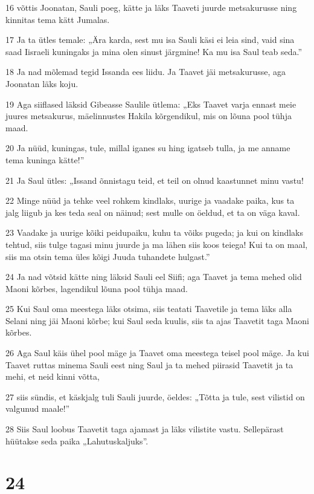 \par 16 võttis Joonatan, Sauli poeg, kätte ja läks Taaveti juurde metsakurusse ning kinnitas tema kätt Jumalas.
\par 17 Ja ta ütles temale: „Ära karda, sest mu isa Sauli käsi ei leia sind, vaid sina saad Iisraeli kuningaks ja mina olen sinust järgmine! Ka mu isa Saul teab seda.”
\par 18 Ja nad mõlemad tegid Issanda ees liidu. Ja Taavet jäi metsakurusse, aga Joonatan läks koju.
\par 19 Aga siiflased läksid Gibeasse Saulile ütlema: „Eks Taavet varja ennast meie juures metsakurus, mäelinnustes Hakila kõrgendikul, mis on lõuna pool tühja maad.
\par 20 Ja nüüd, kuningas, tule, millal iganes su hing igatseb tulla, ja me anname tema kuninga kätte!”
\par 21 Ja Saul ütles: „Issand õnnistagu teid, et teil on olnud kaastunnet minu vastu!
\par 22 Minge nüüd ja tehke veel rohkem kindlaks, uurige ja vaadake paika, kus ta jalg liigub ja kes teda seal on näinud; sest mulle on öeldud, et ta on väga kaval.
\par 23 Vaadake ja uurige kõiki peidupaiku, kuhu ta võiks pugeda; ja kui on kindlaks tehtud, siis tulge tagasi minu juurde ja ma lähen siis koos teiega! Kui ta on maal, siis ma otsin tema üles kõigi Juuda tuhandete hulgast.”
\par 24 Ja nad võtsid kätte ning läksid Sauli eel Siifi; aga Taavet ja tema mehed olid Maoni kõrbes, lagendikul lõuna pool tühja maad.
\par 25 Kui Saul oma meestega läks otsima, siis teatati Taavetile ja tema läks alla Selani ning jäi Maoni kõrbe; kui Saul seda kuulis, siis ta ajas Taavetit taga Maoni kõrbes.
\par 26 Aga Saul käis ühel pool mäge ja Taavet oma meestega teisel pool mäge. Ja kui Taavet ruttas minema Sauli eest ning Saul ja ta mehed piirasid Taavetit ja ta mehi, et neid kinni võtta,
\par 27 siis sündis, et käskjalg tuli Sauli juurde, öeldes: „Tõtta ja tule, sest vilistid on valgunud maale!”
\par 28 Siis Saul loobus Taavetit taga ajamast ja läks vilistite vastu. Sellepärast hüütakse seda paika „Lahutuskaljuks”.

\chapter{24}

